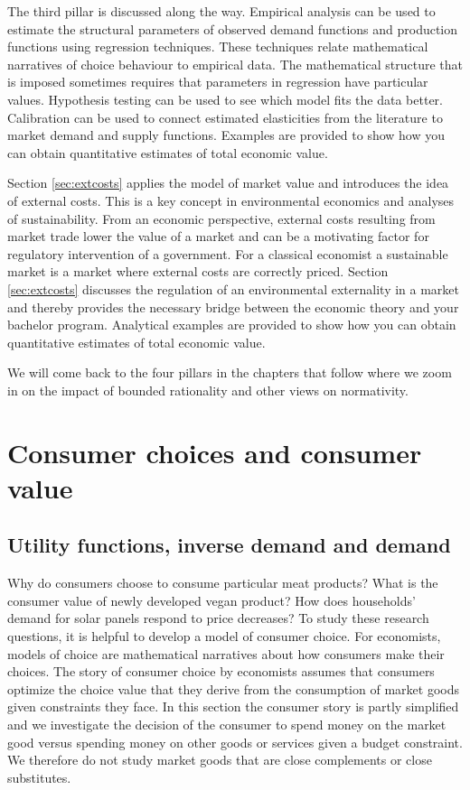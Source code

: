 \documentclass[
]{book}
\begin{document}
The third pillar is discussed along the way. Empirical analysis can be used to estimate the structural parameters of observed demand functions and production functions using regression techniques. These techniques relate mathematical narratives of choice behaviour to empirical data. The mathematical structure that is imposed sometimes requires that parameters in regression have particular values. Hypothesis testing can be used to see which model fits the data better. Calibration can be used to connect estimated elasticities from the literature to market demand and supply functions. Examples are provided to show how you can obtain quantitative estimates of total economic value.

Section \ref{sec:extcosts} applies the model of market value and introduces the idea of external costs. This is a key concept in environmental economics and analyses of sustainability. From an economic perspective, external costs resulting from market trade lower the value of a market and can be a motivating factor for regulatory intervention of a government. For a classical economist a sustainable market is a market where external costs are correctly priced. Section \ref{sec:extcosts} discusses the regulation of an environmental externality in a market and thereby provides the necessary bridge between the economic theory and your bachelor program. Analytical examples are provided to show how you can obtain quantitative estimates of total economic value.

We will come back to the four pillars in the chapters that follow where we zoom in on the impact of bounded rationality and other views on normativity.

\hypertarget{sec:conchoices}{%
\section{Consumer choices and consumer value}\label{sec:conchoices}}

\hypertarget{utility-functions-inverse-demand-and-demand}{%
\subsection{Utility functions, inverse demand and demand}\label{utility-functions-inverse-demand-and-demand}}

Why do consumers choose to consume particular meat products? What is the consumer value of newly developed vegan product? How does households' demand for solar panels respond to price decreases? To study these research questions, it is helpful to develop a model of consumer choice. For economists, models of choice are mathematical narratives about how consumers make their choices. The story of consumer choice by economists assumes that consumers optimize the choice value that they derive from the consumption of market goods given constraints they face. In this section the consumer story is partly simplified and we investigate the decision of the consumer to spend money on the market good versus spending money on other goods or services given a budget constraint. We therefore do not study market goods that are close complements or close substitutes.
\end{document}
